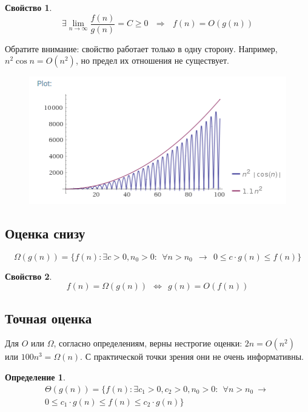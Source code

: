 \documentclass[12pt,a4paper]{report}
\newtheorem*{definition}{Определение}
\newtheorem*{property}{Свойство}
\begin{document}

\begin{property}
$$
\boxed{
  \exists \lim_{n\to\infty} \frac{f(n)}{g(n)} = C \geqslant 0   ~~~\Rightarrow~~~   f(n) = O(g(n))
}
$$
\end{property}


Обратите внимание: свойство работает только в одну сторону. Например, $n^2\cos n = O(n^2)$, но предел их отношения не существует.

\begin{figure}[!ht]
\centering
\includegraphics{cos.png}
\end{figure}

\subsection*{Оценка снизу}

$$
\Omega(g(n)) = \{f(n) : \exists c>0, n_0>0:~~ \forall n > n_0 ~~\to~~ 0 \leqslant c \cdot g(n) \leqslant f(n)\}
$$

\begin{property}
$$
f(n) = \Omega(g(n))   ~~\Leftrightarrow~~  g(n) = O(f(n))
$$
\end{property}


\subsection*{Точная оценка}

Для $O$ или $\Omega$, согласно определениям, верны нестрогие оценки: $2n = O(n^2)$ или $100n^3 = \Omega(n)$. С практической точки зрения они не очень информативны.

\begin{definition}
$$
  \begin{gathered}
  \Theta(g(n)) = \{f(n) : \exists c_1>0, c_2>0, n_0>0:~~ \forall n > n_0 ~\to~\\
  0 \leqslant c_1 \cdot g(n) \leqslant f(n) \leqslant c_2 \cdot g(n)\} \\
  \end{gathered}
$$
\end{definition}
\end{document}
